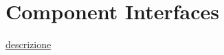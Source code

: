 \documentclass[../../../../dd.tex]{subfiles}
\begin{document}
	\section{Component Interfaces}
		\href{https://docs.oracle.com/cd/E26239_01/pt851h3/eng/psbooks/tcpi/chapter.htm?File=tcpi/htm/tcpi03.htm}{descrizione}
	
\end{document}
